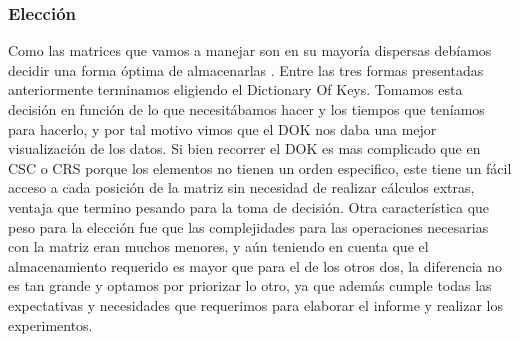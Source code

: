 \subsubsection{Elección}
Como las matrices que vamos a manejar son en su mayoría dispersas debíamos decidir una forma óptima de almacenarlas .
Entre las tres formas presentadas anteriormente terminamos eligiendo el Dictionary Of Keys. Tomamos esta decisión en función de lo que necesitábamos hacer y los tiempos que teníamos para hacerlo, y por tal motivo vimos que el DOK nos daba una mejor visualización de los datos. Si bien recorrer el DOK es mas complicado que en CSC o CRS porque los elementos no tienen un orden especifico, este tiene un fácil acceso a cada posición de la matriz sin necesidad de realizar cálculos extras, ventaja que termino pesando para la toma de decisión.  Otra característica que peso para la elección fue que las complejidades para las operaciones necesarias con la matriz eran muchos menores, y aún teniendo en cuenta que el almacenamiento requerido es mayor que para el de los otros dos, la diferencia no es tan grande y optamos por priorizar lo otro, ya que además cumple todas las expectativas y necesidades que requerimos para elaborar el informe y realizar los experimentos.




